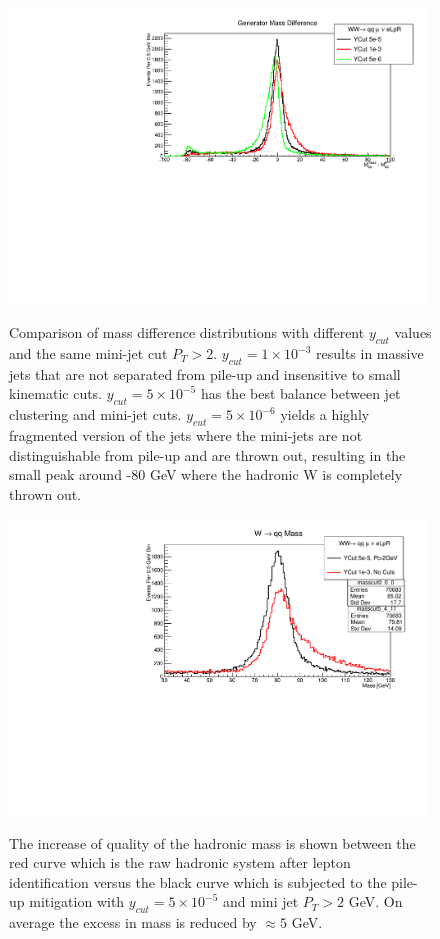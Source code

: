 \begin{figure}
    \centering
    \begin{minipage}{0.49\textwidth}
        \centering
        \label{fig:supdiff}
        \includegraphics[width=0.99\textwidth]{SupDiff.pdf} %
        \caption{Comparison of mass difference distributions with different $y_{cut}$ values and the same mini-jet cut $P_T > 2$. $y_{cut} = 1\times 10^{-3}$ results in massive jets that are not separated from pile-up and insensitive to small kinematic cuts. $y_{cut} = 5\times 10^{-5}$ has the best balance between jet clustering and mini-jet cuts. $y_{cut} = 5\times 10^{-6}$ yields a highly fragmented version of the jets where the mini-jets are not distinguishable from pile-up and are thrown out, resulting in the small peak around -80 GeV where the hadronic W is completely thrown out.  }
    \end{minipage}\hfill
    \begin{minipage}{0.49\textwidth}
        \centering
        \label{fig:supmass}
        \includegraphics[width=0.99\textwidth]{SupMass.pdf} %
        \caption{The increase of quality of the hadronic mass is shown between the red curve which is the raw hadronic system after lepton identification versus the black curve which is subjected to the pile-up mitigation with $y_{cut} = 5\times10^{-5}$ and mini jet $P_T > 2$ GeV. On average the excess in mass is reduced by $\approx 5$ GeV. }
    \end{minipage}
\end{figure}


